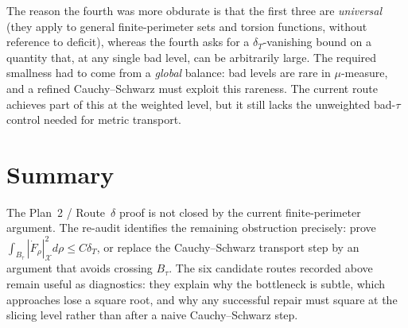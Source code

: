 \documentclass[11pt]{article}
\theoremstyle{definition}
\newcommand{\X}{\mathcal X}
\begin{document}
The reason the fourth was more obdurate is that the first three are
\emph{universal} (they apply to general finite-perimeter sets and
torsion functions, without reference to deficit), whereas the fourth
asks for a $\delta_{T}$-vanishing bound on a quantity that, at any
single bad level, can be arbitrarily large.  The required smallness
had to come from a \emph{global} balance: bad levels are rare in
$\mu$-measure, and a refined Cauchy--Schwarz must exploit this
rareness.  The current route achieves part of this at the weighted
level, but it still lacks the unweighted bad-$\tau$ control needed for
metric transport.

\section{Summary}\label{sec:summary}

The Plan~2 / Route~$\delta$ proof is not closed by the current
finite-perimeter argument.  The re-audit identifies the remaining
obstruction precisely: prove
$\int_{B_\tau}|\dot F_\rho|_{\X}^{2}d\rho\le C\delta_T$, or replace
the Cauchy--Schwarz transport step by an argument that avoids crossing
$B_\tau$.  The six candidate routes recorded above remain useful as
diagnostics: they explain why the bottleneck is subtle, which
approaches lose a square root, and why any successful repair must
square at the slicing level rather than after a naive
Cauchy--Schwarz step.
\end{document}
